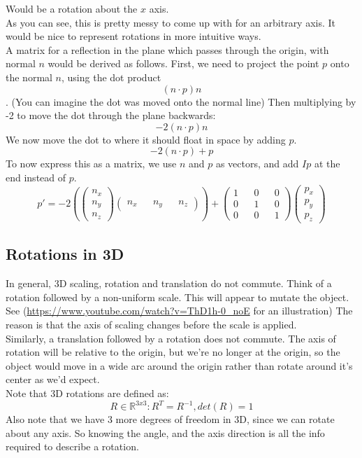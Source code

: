 \documentclass[12pt]{article}
\theoremstyle{definition}
\begin{document}
Would be a rotation about the $x$ axis.
\\ \linebreak
As you can see, this is pretty messy to come up with for an arbitrary axis. It would be nice to represent rotations in more intuitive ways.
\\ \linebreak
A matrix for a reflection in the plane which passes through the origin, with normal $n$ would be derived as follows. First, we need to project the point $p$ onto the normal $n$, using the dot product $$(n \cdot p)n$$. (You can imagine the dot was moved onto the normal line) Then multiplying by -2 to move the dot through the plane backwards: $$-2(n \cdot p)n$$ We now move the dot to where it should float in space by adding $p$. $$-2(n \cdot p) + p$$
To now express this as a matrix, we use $n$ and $p$ as vectors, and add $Ip$ at the end instead of $p$. $$ p' = -2 (\begin{pmatrix}
	n_x \\ n_y \\ n_z
\end{pmatrix}
\begin{pmatrix}
	n_x && n_y && n_z
\end{pmatrix}) +
\begin{pmatrix}
	1 && 0 && 0 \\
	0 && 1 && 0 \\
	0 && 0 && 1
\end{pmatrix}
\begin{pmatrix}
	p_x \\ p_y \\ p_z
\end{pmatrix}
$$
\subsection{Rotations in 3D}
In general, 3D scaling, rotation and translation do not commute. Think of a rotation followed by a non-uniform scale. This will appear to mutate the object. See (\url{https://www.youtube.com/watch?v=ThD1h-0_noE} for an illustration) The reason is that the axis of scaling changes before the scale is applied.
\\ \linebreak
Similarly, a translation followed by a rotation does not commute. The axis of rotation will be relative to the origin, but we're no longer at the origin, so the object would move in a wide arc around the origin rather than rotate around it's center as we'd expect.
\\ \linebreak
Note that 3D rotations are defined as:
$$ R \in \mathds{R}^{3x3}: R^T = R^{-1}, det(R) = 1$$
Also note that we have 3 more degrees of freedom in 3D, since we can rotate about any axis. So knowing the angle, and the axis direction is all the info required to describe a rotation.
\end{document}
